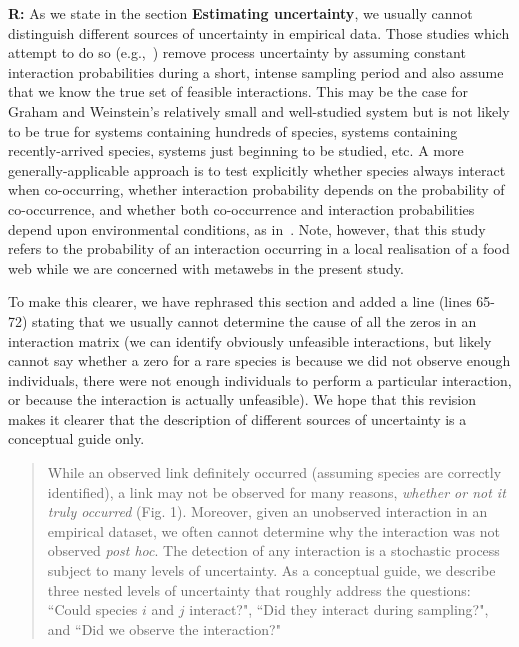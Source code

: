 \documentclass[12pt]{letter}
\begin{document}
		\textbf{R:} As we state in the section \textbf{Estimating uncertainty}, we usually cannot distinguish different sources of uncertainty in empirical data. Those studies which attempt to do so (e.g.,~\citet{Graham2018}) remove process uncertainty by assuming constant interaction probabilities during a short, intense sampling period and also assume that we know the true set of feasible interactions. This may be the case for Graham and Weinstein's relatively small and well-studied system but is not likely to be true for systems containing hundreds of species, systems containing recently-arrived species, systems just beginning to be studied, etc. A more generally-applicable approach is to test explicitly whether species always interact when co-occurring, whether interaction probability depends on the probability of co-occurrence, and whether both co-occurrence and interaction probabilities depend upon environmental conditions, as in~\citet{Gravel2018}. Note, however, that this study refers to the probability of an interaction occurring in a local realisation of a food web while we are concerned with metawebs in the present study.
		

		To make this clearer, we have rephrased this section and added a line (lines 65-72) stating that we usually cannot determine the cause of all the zeros in an interaction matrix (we can identify obviously unfeasible interactions, but likely cannot say whether a zero for a rare species is because we did not observe enough individuals, there were not enough individuals to perform a particular interaction, or because the interaction is actually unfeasible). We hope that this revision makes it clearer that the description of different sources of uncertainty is a conceptual guide only.


		\begin{quotation}
			While an observed link definitely occurred (assuming species are correctly identified), a link may not be observed for many reasons, \emph{whether or not it truly occurred} (Fig. 1). Moreover, given an unobserved interaction in an empirical dataset, we often cannot determine why the interaction was not observed \emph{post hoc}. The detection of any interaction is a stochastic process subject to many levels of uncertainty. As a conceptual guide, we describe three nested levels of uncertainty that roughly address the questions: ``Could species $i$ and $j$ interact?", ``Did they interact during sampling?", and ``Did we observe the interaction?"
		\end{quotation}
\end{document}
